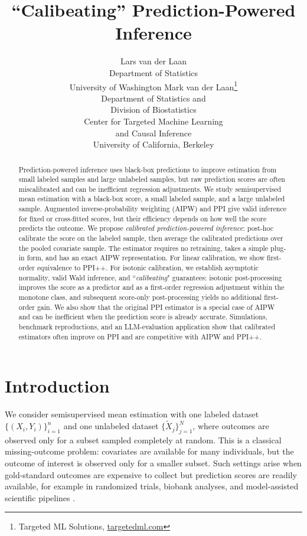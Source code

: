 \documentclass{article}
\title{``Calibeating'' Prediction-Powered Inference}
\author{
Lars van der Laan\\
Department of Statistics\\
University of Washington
\And
Mark van der Laan\thanks{Targeted ML Solutions, \href{https://www.targetedml.com/}{targetedml.com}}\\
Department of Statistics and\\
Division of Biostatistics\\
Center for Targeted Machine Learning\\
and Causal Inference\\
University of California, Berkeley
}
\theoremstyle{plain}
\theoremstyle{definition}
\newcommand{\1}{\mathbf{1}}
\begin{document}
\maketitle
\begin{abstract}
Prediction-powered inference uses black-box predictions to improve estimation
from small labeled samples and large unlabeled samples, but raw prediction
scores are often miscalibrated and can be inefficient regression adjustments.
We study semisupervised mean estimation with a black-box score, a small labeled
sample, and a large unlabeled sample. Augmented inverse-probability weighting
(AIPW) and PPI give valid inference for
fixed or cross-fitted scores, but their efficiency depends on how well the score
predicts the outcome. We propose \emph{calibrated prediction-powered
inference}: post-hoc calibrate the score on the labeled sample, then average the
calibrated predictions over the pooled covariate sample. The estimator requires
no retraining, takes a simple plug-in form, and has an exact AIPW
representation. For linear calibration, we show first-order equivalence to
PPI++. For isotonic calibration, we establish asymptotic normality, valid Wald
inference, and ``\textit{calibeating}" guarantees: isotonic post-processing
improves the score as a predictor and as a first-order regression adjustment
within the monotone class, and subsequent score-only post-processing yields no
additional first-order gain. We also show that the original PPI estimator is a
special case of AIPW and can be inefficient when the prediction score is already
accurate. Simulations, benchmark reproductions, and an LLM-evaluation
application show that calibrated estimators often improve on PPI and are
competitive with AIPW and PPI++.
\end{abstract}

\section{Introduction}

We consider semisupervised mean estimation with one labeled dataset
\(\{(X_i,Y_i)\}_{i=1}^n\) and one unlabeled dataset
\(\{\widetilde X_j\}_{j=1}^N\), where outcomes are observed only for a subset
sampled completely at random. This is a classical missing-outcome problem:
covariates are available for many individuals, but the outcome of interest is
observed only for a smaller subset. Such settings arise when gold-standard
outcomes are expensive to collect but prediction scores are readily available,
for example in randomized trials, biobank analyses, and model-assisted
scientific pipelines
\citep{schuler2022increasing,hong2019semisupervised,zhang2019phecap,ppi2023,crossppi2024}.
\end{document}
